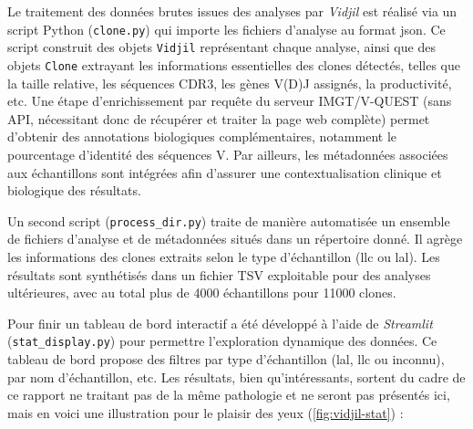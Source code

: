 \vspace{1em}

Le traitement des données brutes issues des analyses par \textit{Vidjil} est réalisé via un script Python (\texttt{clone.py}) qui importe les fichiers d'analyse au format \gls{json}. 
Ce script construit des objets \texttt{Vidjil} représentant chaque analyse, ainsi que des objets \texttt{Clone} extrayant les informations essentielles des clones détectés, 
telles que la taille relative, les séquences CDR3, les gènes V(D)J assignés, la productivité, etc. Une étape d'enrichissement par requête du serveur IMGT/V-QUEST 
(sans API, nécessitant donc de récupérer et traiter la page web complète) permet d'obtenir des annotations biologiques complémentaires, notamment le pourcentage d'identité des séquences V.
Par ailleurs, les métadonnées associées aux échantillons sont intégrées afin d'assurer une contextualisation clinique et biologique des résultats.

\vspace{1em}

Un second script (\texttt{process\_dir.py}) traite de manière automatisée un ensemble de fichiers d'analyse et de métadonnées situés dans un répertoire donné. 
Il agrège les informations des clones extraits selon le type d'échantillon (\gls{llc} ou \gls{lal}). Les résultats sont synthétisés dans un fichier TSV exploitable 
pour des analyses ultérieures, avec au total plus de 4000 échantillons pour 11000 clones.

\vspace{1em}

Pour finir un tableau de bord interactif a été développé à l'aide de \textit{Streamlit} (\texttt{stat\_display.py}) pour permettre l'exploration dynamique des données. 
Ce tableau de bord propose des filtres par type d'échantillon (\gls{lal}, \gls{llc} ou inconnu), par nom d'échantillon, etc. Les résultats, bien qu'intéressants, sortent du cadre 
de ce rapport ne traitant pas de la même pathologie et ne seront pas présentés ici, mais en voici une illustration pour le plaisir des yeux (\autoref{fig:vidjil-stat}) :

